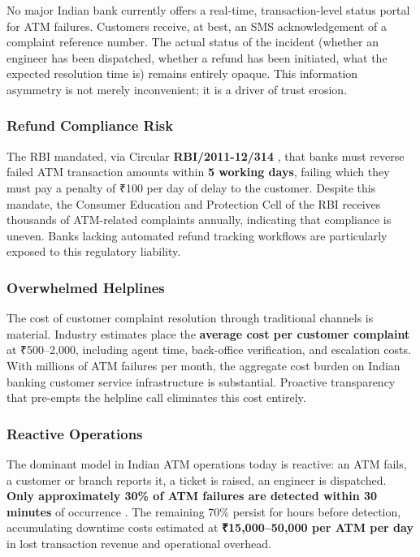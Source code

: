\documentclass[12pt,a4paper]{article}
\newcommand{\inr}{₹}
\begin{document}
No major Indian bank currently offers a real-time, transaction-level status portal for ATM
failures. Customers receive, at best, an SMS acknowledgement of a complaint reference number.
The actual status of the incident (whether an engineer has been dispatched, whether a refund
has been initiated, what the expected resolution time is) remains entirely opaque. This
information asymmetry is not merely inconvenient; it is a driver of trust erosion.

\subsubsection{Refund Compliance Risk}

The RBI mandated, via Circular \textbf{RBI/2011-12/314} \citep{rbi2011circular}, that banks must
reverse failed ATM transaction amounts within \textbf{5 working days}, failing which they must
pay a penalty of \inr{}100 per day of delay to the customer. Despite this mandate, the Consumer
Education and Protection Cell of the RBI receives thousands of ATM-related complaints annually,
indicating that compliance is uneven. Banks lacking automated refund tracking workflows are
particularly exposed to this regulatory liability.

\subsubsection{Overwhelmed Helplines}

The cost of customer complaint resolution through traditional channels is material. Industry
estimates place the \textbf{average cost per customer complaint} at \inr{}500--2,000, including
agent time, back-office verification, and escalation costs. With millions of ATM failures per
month, the aggregate cost burden on Indian banking customer service infrastructure is substantial.
Proactive transparency that pre-empts the helpline call eliminates this cost entirely.

\subsubsection{Reactive Operations}

The dominant model in Indian ATM operations today is reactive: an ATM fails, a customer or
branch reports it, a ticket is raised, an engineer is dispatched. \textbf{Only approximately
30\% of ATM failures are detected within 30 minutes} of occurrence \citep{atia2023report}. The
remaining 70\% persist for hours before detection, accumulating downtime costs estimated at
\textbf{\inr{}15,000--50,000 per ATM per day} in lost transaction revenue and operational overhead.
\end{document}
